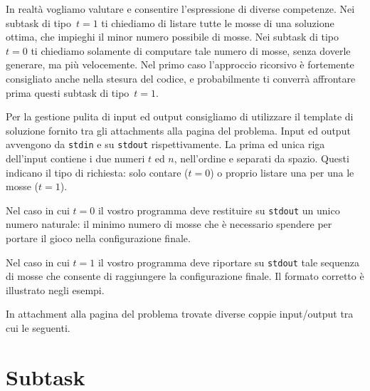 In realtà vogliamo valutare e consentire l'espressione di diverse competenze. Nei subtask di tipo~$t=1$ ti chiediamo di listare tutte le mosse di una soluzione ottima, che impieghi il minor numero possibile di mosse.
Nei subtask di tipo~$t=0$ ti chiediamo solamente di computare tale numero di mosse, senza doverle generare, ma più velocemente.
Nel primo caso l'approccio ricorsivo è fortemente consigliato anche nella stesura del codice, e probabilmente ti converrà affrontare prima questi subtask di tipo~$t=1$.



Per la gestione pulita di input ed output consigliamo di utilizzare il template di soluzione fornito tra gli attachments alla pagina del problema.
Input ed output avvengono da \verb'stdin' e su \verb'stdout' rispettivamente.
La prima ed unica riga dell'input contiene i due numeri $t$ ed $n$, nell'ordine e separati da spazio. Questi indicano il tipo di richiesta: solo contare ($t=0$) o proprio listare una per una le mosse ($t=1$).

\indent
Nel caso in cui $t=0$ il vostro programma deve restituire su \verb'stdout' un unico numero naturale: il minimo numero di mosse che è necessario spendere per portare il gioco nella configurazione finale.

\indent
Nel caso in cui $t= 1$ il vostro programma deve riportare su \verb'stdout' tale sequenza di mosse che consente di raggiungere la configurazione finale. Il formato corretto è illustrato negli esempi.



In attachment alla pagina del problema trovate diverse coppie input/output tra cui le seguenti.


\vspace{0.5cm}

\vspace{0.5cm}

\vspace{0.5cm}



\section*{Subtask}

